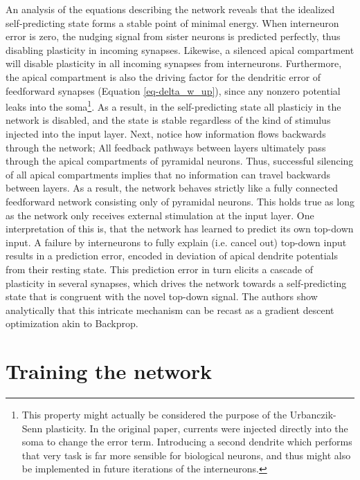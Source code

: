 An analysis of the equations describing the network reveals that the idealized self-predicting state forms a stable
point of minimal energy. When interneuron error is zero, the nudging signal from sister neurons is predicted perfectly,
thus disabling plasticity in incoming synapses. Likewise, a silenced apical compartment will disable plasticity in all
incoming synapses from interneurons. Furthermore, the apical compartment is also the driving factor for the dendritic
error of feedforward synapses (Equation \ref{eq-delta_w_up}), since any nonzero potential leaks into the
soma\footnote{This property might actually be considered the purpose of the Urbanczik-Senn plasticity. In the original
paper, currents were injected directly into the soma to change the error term. Introducing a second dendrite which
performs that very task is far more sensible for biological neurons, and thus might also be implemented in future
iterations of the interneurons.}. As a result, in the self-predicting state all plasticiy in the network is disabled, and the
state is stable regardless of the kind of stimulus injected into the input layer. Next, notice how information flows
backwards through the network; All feedback pathways between layers ultimately pass through the apical compartments of
pyramidal neurons. Thus, successful silencing of all apical compartments implies that no information can travel
backwards between layers. As a result, the network behaves strictly like a fully connected feedforward network
consisting only of pyramidal neurons. This holds true as long as the network only receives external stimulation at the
input layer. One interpretation of this is, that the network has learned to predict its own top-down input. A failure by
interneurons to fully explain (i.e. cancel out) top-down input results in a prediction error, encoded in deviation
of apical dendrite potentials from their resting state. This prediction error in turn elicits a cascade of plasticity in
several synapses, which drives the network towards a self-predicting state that is congruent with the novel top-down
signal. The authors show analytically that this intricate mechanism can be recast as a gradient descent optimization
akin to Backprop.



\section{Training the network}

